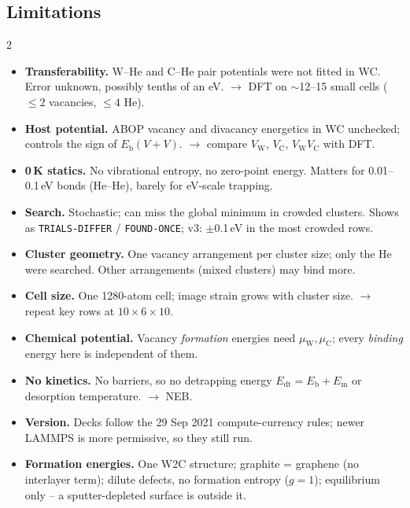 \documentclass[10pt]{article}
\newcommand{\cmd}[1]{\texttt{\small #1}}
\newcommand{\Eb}{E_\mathrm{b}}
\begin{document}
\subsection*{Limitations}
\begin{multicols}{2}
\begin{itemize}
\item \textbf{Transferability.} W--He and C--He pair potentials were not fitted in WC. Error unknown, possibly tenths of an eV. $\to$ DFT on $\sim$12--15 small cells ($\le2$ vacancies, $\le4$ He).
\item \textbf{Host potential.} ABOP vacancy and divacancy energetics in WC unchecked; controls the sign of $\Eb(V{+}V)$. $\to$ compare $V_\mathrm{W}$, $V_\mathrm{C}$, $V_\mathrm{W}V_\mathrm{C}$ with DFT.
\item \textbf{0\,K statics.} No vibrational entropy, no zero-point energy. Matters for 0.01--0.1\,eV bonds (He--He), barely for eV-scale trapping.
\item \textbf{Search.} Stochastic; can miss the global minimum in crowded clusters. Shows as \cmd{TRIALS-DIFFER} / \cmd{FOUND-ONCE}; v3: $\pm$0.1\,eV in the most crowded rows.
\item \textbf{Cluster geometry.} One vacancy arrangement per cluster size; only the He were searched. Other arrangements (mixed clusters) may bind more.
\item \textbf{Cell size.} One 1280-atom cell; image strain grows with cluster size. $\to$ repeat key rows at $10\times6\times10$.
\item \textbf{Chemical potential.} Vacancy \emph{formation} energies need $\mu_\mathrm{W},\mu_\mathrm{C}$; every \emph{binding} energy here is independent of them.
\item \textbf{No kinetics.} No barriers, so no detrapping energy $E_\mathrm{dt}=\Eb+E_\mathrm{m}$ or desorption temperature. $\to$ NEB.
\item \textbf{Version.} Decks follow the 29 Sep 2021 compute-currency rules; newer LAMMPS is more permissive, so they still run.
\item \textbf{Formation energies.} One W2C structure; graphite = graphene (no interlayer term); dilute defects, no formation entropy ($g=1$); equilibrium only -- a sputter-depleted surface is outside it.
\end{itemize}
\end{multicols}
\end{document}
